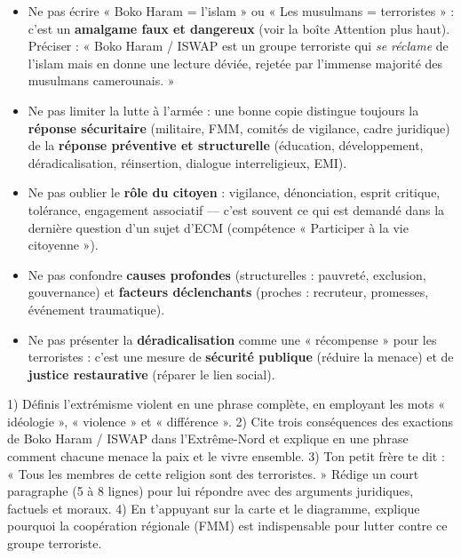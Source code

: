\documentclass[11pt]{article}
\begin{document}
\begin{attention}
\begin{itemize}
\item Ne pas écrire « Boko Haram = l'islam » ou « Les musulmans = terroristes » : c'est un \textbf{amalgame faux et dangereux} (voir la boîte Attention plus haut). Préciser : « Boko Haram / ISWAP est un groupe terroriste qui \emph{se réclame} de l'islam mais en donne une lecture déviée, rejetée par l'immense majorité des musulmans camerounais. »
\item Ne pas limiter la lutte à l'armée : une bonne copie distingue toujours la \textbf{réponse sécuritaire} (militaire, FMM, comités de vigilance, cadre juridique) de la \textbf{réponse préventive et structurelle} (éducation, développement, déradicalisation, réinsertion, dialogue interreligieux, EMI).
\item Ne pas oublier le \textbf{rôle du citoyen} : vigilance, dénonciation, esprit critique, tolérance, engagement associatif — c'est souvent ce qui est demandé dans la dernière question d'un sujet d'ECM (compétence « Participer à la vie citoyenne »).
\item Ne pas confondre \textbf{causes profondes} (structurelles : pauvreté, exclusion, gouvernance) et \textbf{facteurs déclenchants} (proches : recruteur, promesses, événement traumatique).
\item Ne pas présenter la \textbf{déradicalisation} comme une « récompense » pour les terroristes : c'est une mesure de \textbf{sécurité publique} (réduire la menace) et de \textbf{justice restaurative} (réparer le lien social).
\end{itemize}
\end{attention}

\begin{exercice}
1) Définis l'extrémisme violent en une phrase complète, en employant les mots « idéologie », « violence » et « différence ».
2) Cite trois conséquences des exactions de Boko Haram / ISWAP dans l'Extrême-Nord et explique en une phrase comment chacune menace la paix et le vivre ensemble.
3) Ton petit frère te dit : « Tous les membres de cette religion sont des terroristes. » Rédige un court paragraphe (5 à 8 lignes) pour lui répondre avec des arguments juridiques, factuels et moraux.
4) En t'appuyant sur la carte et le diagramme, explique pourquoi la coopération régionale (FMM) est indispensable pour lutter contre ce groupe terroriste.
\end{exercice}
\end{document}
